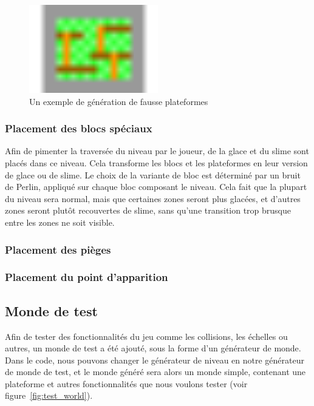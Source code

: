 \documentclass[10pt]{report}
\begin{document}
\begin{figure}[H]
  \centering
  \includegraphics[width=0.5\textwidth]{images/fake_platforms.png}
  \caption{Un exemple de génération de fausse plateformes}
  \label{fig:fake_platforms}
\end{figure}

\subsubsection{Placement des blocs spéciaux}

Afin de pimenter la traversée du niveau par le joueur, de la glace et du 
slime sont placés dans ce niveau. Cela transforme les blocs et les 
plateformes en leur version de glace ou de slime. Le choix de la variante
de bloc est déterminé par un bruit de Perlin, appliqué sur chaque bloc
composant le niveau. Cela fait que la plupart du niveau sera normal, mais
que certaines zones seront plus glacées, et d'autres zones seront plutôt
recouvertes de slime, sans qu'une transition trop brusque entre les zones
ne soit visible.

\subsubsection{Placement des pièges}

\subsubsection{Placement du point d'apparition}

\subsection{Monde de test}

Afin de tester des fonctionnalités du jeu comme les collisions, les 
échelles ou autres, un monde de test a été ajouté, sous la forme d'un 
générateur de monde. Dans le code, nous pouvons changer le générateur de
niveau en notre générateur de monde de test, et le monde généré sera alors
un monde simple, contenant une plateforme et autres fonctionnalités que
nous voulons tester (voir figure~\ref{fig:test_world}).
\end{document}
